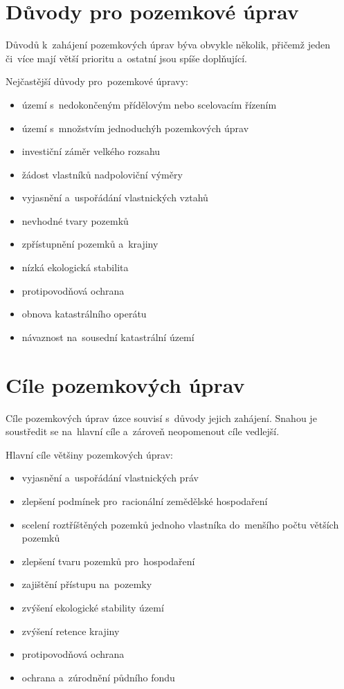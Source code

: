 \section{Důvody pro pozemkové úprav}
\label{duvody_pu}

Důvodů k~zahájení pozemkových úprav býva obvykle několik, přičemž jeden či~více mají větší prioritu a~ostatní jsou spíše doplňující.

Nejčastější důvody pro~pozemkové úpravy:
	\begin{itemize}[leftmargin=1.5cm, noitemsep]
		\item území s~nedokončeným přídělovým nebo scelovacím řízením
		\item území s~množstvím jednoduchýh pozemkových úprav
		\item investiční záměr velkého rozsahu
		\item žádost vlastníků nadpoloviční výměry
		\item vyjasnění a~uspořádání vlastnických vztahů
		\item nevhodné tvary pozemků
		\item zpřístupnění pozemků a~krajiny
		\item nízká ekologická stabilita
		\item protipovodňová ochrana
		\item obnova katastrálního operátu
		\item návaznost na~sousední katastrální území
	\end{itemize}

\section{Cíle pozemkových úprav}
\label{cile_pu}

Cíle pozemkových úprav úzce souvisí s~důvody jejich zahájení. Snahou je soustředit se na~hlavní cíle a~zároveň neopomenout cíle vedlejší.

Hlavní cíle většiny pozemkových úprav:
	\begin{itemize}[leftmargin=1.5cm, noitemsep]
		\item vyjasnění a~uspořádání vlastnických práv
		\item zlepšení podmínek pro~racionální zemědělské hospodaření
		\item scelení roztříštěných pozemků jednoho vlastníka do~menšího počtu větších pozemků
		\item zlepšení tvaru pozemků pro~hospodaření
		\item zajištění přístupu na~pozemky
		\item zvýšení ekologické stability území
		\item zvýšení retence krajiny
		\item protipovodňová ochrana
		\item ochrana a~zúrodnění půdního fondu
	\end{itemize}


